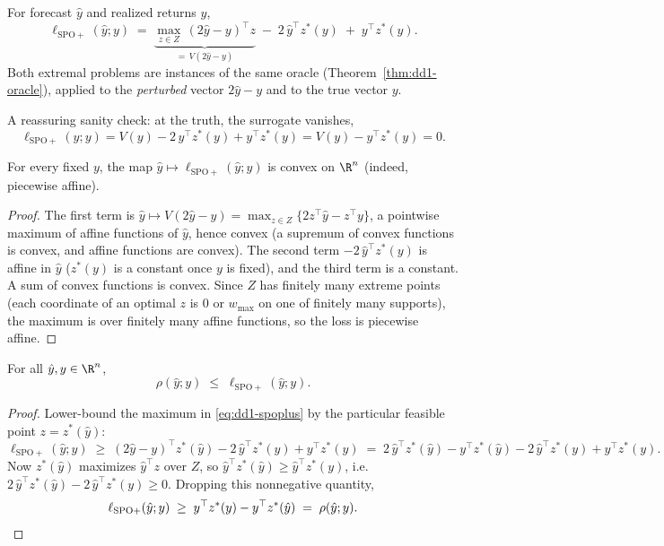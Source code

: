 \begin{definition}
\label{def:dd1-spoplus}
For forecast $\hat{y}$ and realized returns $y$,
\begin{equation}
\label{eq:dd1-spoplus}
\ell_{\mathrm{SPO+}}(\hat{y}; y)
\;=\; \underbrace{\max_{z \in Z}\, (2\hat{y} - y)^\top z}_{\textstyle
= \,V(2\hat{y} - y)}
\;-\; 2\,\hat{y}^\top z^*(y)
\;+\; y^\top z^*(y).
\end{equation}
Both extremal problems are instances of the same oracle
(Theorem~\ref{thm:dd1-oracle}), applied to the \emph{perturbed} vector
$2\hat{y} - y$ and to the true vector $y$.
\end{definition}

A reassuring sanity check: at the truth, the surrogate vanishes,
\[
\ell_{\mathrm{SPO+}}(y; y) = V(y) - 2\,y^\top z^*(y) + y^\top z^*(y)
= V(y) - y^\top z^*(y) = 0 .
\]

\begin{proposition}
\label{prop:dd1-spoplus-convex}
For every fixed $y$, the map $\hat{y} \mapsto \ell_{\mathrm{SPO+}}(\hat{y}; y)$
is convex on $\R^n$ (indeed, piecewise affine).
\end{proposition}

\begin{proof}
The first term is $\hat{y} \mapsto V(2\hat{y} - y) =
\max_{z \in Z} \{ 2 z^\top \hat{y} - z^\top y \}$, a pointwise maximum of
affine functions of $\hat{y}$, hence convex (a supremum of convex functions is
convex, and affine functions are convex). The second term
$-2\,\hat{y}^\top z^*(y)$ is affine in $\hat{y}$ ($z^*(y)$ is a constant once
$y$ is fixed), and the third term is a constant. A sum of convex functions is
convex. Since $Z$ has finitely many extreme points (each coordinate of an
optimal $z$ is $0$ or $w_{\max}$ on one of finitely many supports), the
maximum is over finitely many affine functions, so the loss is piecewise
affine.
\end{proof}

\begin{proposition}
\label{prop:dd1-spoplus-majorize}
For all $\hat{y}, y \in \R^n$,
\begin{equation}
\label{eq:dd1-majorize}
\rho(\hat{y}; y) \;\le\; \ell_{\mathrm{SPO+}}(\hat{y}; y).
\end{equation}
\end{proposition}

\begin{proof}
Lower-bound the maximum in \eqref{eq:dd1-spoplus} by the particular feasible
point $z = z^*(\hat{y})$:
\[
\ell_{\mathrm{SPO+}}(\hat{y}; y)
\;\ge\; (2\hat{y} - y)^\top z^*(\hat{y}) - 2\,\hat{y}^\top z^*(y)
+ y^\top z^*(y)
\;=\; 2\,\hat{y}^\top z^*(\hat{y}) - y^\top z^*(\hat{y})
- 2\,\hat{y}^\top z^*(y) + y^\top z^*(y).
\]
Now $z^*(\hat{y})$ maximizes $\hat{y}^\top z$ over $Z$, so
$\hat{y}^\top z^*(\hat{y}) \ge \hat{y}^\top z^*(y)$, i.e.\
$2\,\hat{y}^\top z^*(\hat{y}) - 2\,\hat{y}^\top z^*(y) \ge 0$. Dropping this
nonnegative quantity,
\[
\ell_{\mathrm{SPO+}}(\hat{y}; y)
\;\ge\; y^\top z^*(y) - y^\top z^*(\hat{y})
\;=\; \rho(\hat{y}; y). \qedhere
\]
\end{proof}

